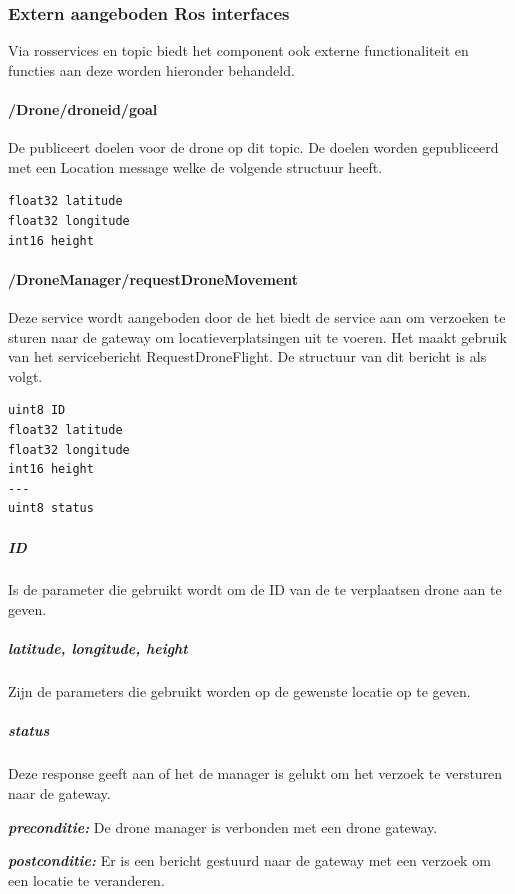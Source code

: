 \documentclass[a4paper, 11pt, oneside]{report}
\begin{document}
\subsubsection{Extern aangeboden Ros interfaces}
\label{DetailedDesign:ros:extern:rosinterfaces}
Via rosservices en topic biedt het component ook externe functionaliteit en functies aan deze worden hieronder behandeld.

\paragraph{/Drone/drone\textunderscore id/goal}
\label{DetailedDesign:ros:extern:rosinterfaces:topic:goal}
De  publiceert doelen voor de drone op dit topic.
De doelen worden gepubliceerd met een Location message welke de volgende structuur heeft.

\begin{lstlisting}
float32 latitude
float32 longitude
int16 height
\end{lstlisting}


\paragraph{/DroneManager/requestDroneMovement}
\label{DetailedDesign:ros:extern:rosinterfaces:service:requestDronemovement}

Deze service wordt aangeboden door de  het biedt de service aan om verzoeken te sturen naar de gateway om locatieverplatsingen uit te voeren. Het maakt gebruik van het servicebericht RequestDroneFlight. De structuur van dit bericht is als volgt.

\begin{lstlisting}
uint8 ID
float32 latitude
float32 longitude
int16 height
---
uint8 status
\end{lstlisting}

\subparagraph{ID} Is de parameter die gebruikt wordt om de ID van de te verplaatsen drone aan te geven.
\subparagraph{latitude, longitude, height} Zijn de parameters die gebruikt worden op de gewenste locatie op te geven.
\subparagraph{status} Deze response geeft aan of het de manager is gelukt om het verzoek te versturen naar de gateway.


\textbf{\textit{preconditie:}} De drone manager is verbonden met een drone gateway. 

\textbf{\textit{postconditie:}} Er is een bericht gestuurd naar de gateway met een verzoek om een locatie te veranderen.
\end{document}

